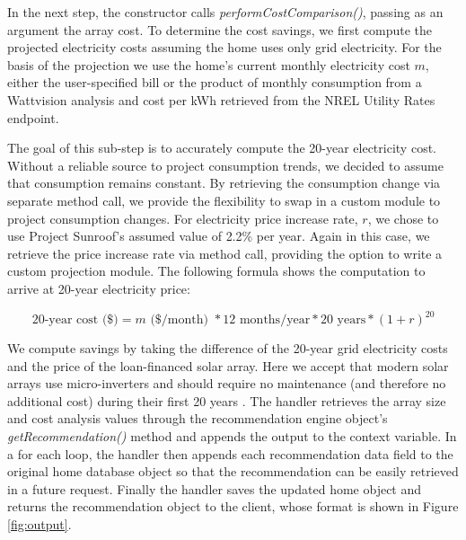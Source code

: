 \documentclass[pageno]{jpaper}
\begin{document}
In the next step, the constructor calls {\em performCostComparison()}, passing as an argument the array cost. To determine the cost savings, we first compute the projected electricity costs assuming the home uses only grid electricity. For the basis of the projection we use the home's current monthly electricity cost $m$, either the user-specified bill or the product of monthly consumption from a Wattvision analysis and cost per kWh retrieved from the NREL Utility Rates endpoint. 

The goal of this sub-step is to accurately compute the 20-year electricity cost. Without a reliable source to project consumption trends, we decided to assume that consumption remains constant. By retrieving the consumption change via separate method call, we provide the flexibility to swap in a custom module to project consumption changes. For electricity price increase rate, $r$, we chose to use Project Sunroof's assumed value of 2.2\% per year. Again in this case, we retrieve the price increase rate via method call, providing the option to write a custom projection module. The following formula shows the computation to arrive at 20-year electricity price:

\[ \mbox{20-year cost (\$)} = m \mbox{ (\$/month) } * \mbox{12 months/year} * \mbox{20 years}  * (1+ r)^{20} \]

We compute savings by taking the difference of the 20-year grid electricity costs and the price of the loan-financed solar array. Here we accept that modern solar arrays use micro-inverters and should require no maintenance (and therefore no additional cost) during their first 20 years \cite{Sunroof}. The handler retrieves the array size and cost analysis values through the recommendation engine object's  {\em getRecommendation()} method and appends the output to the context variable. In a for each loop, the handler then appends each recommendation data field to the original home database object so that the recommendation can be easily retrieved in a future request. Finally the handler saves the updated home object and returns the recommendation object to the client, whose format is shown in Figure \ref{fig:output}.
\end{document}
